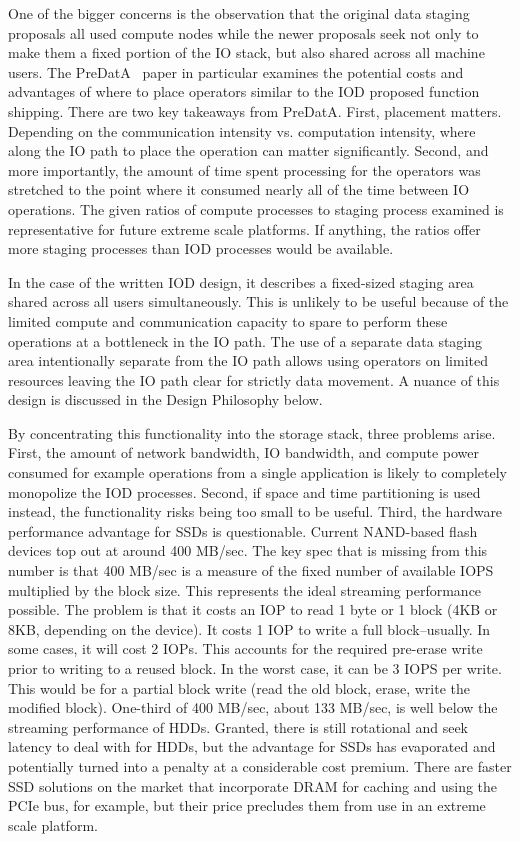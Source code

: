 \documentclass[conference]{IEEEtran}
\begin{document}
One of the bigger concerns is the observation that the original data staging
proposals all used compute nodes while the newer proposals seek not only to
make them a fixed portion of the IO stack, but also shared across all machine
users. The PreDatA~\cite{zheng:2010:predata} paper in particular examines the
potential costs and advantages of where to place operators similar to the IOD
proposed function shipping. There are two key takeaways from PreDatA. First,
placement matters.  Depending on the communication intensity vs. computation
intensity, where along the IO path to place the operation can matter
significantly. Second, and more importantly, the amount of time spent
processing for the operators was stretched to the point where it consumed
nearly all of the time between IO operations. The given ratios of compute
processes to staging process examined is representative for future extreme
scale platforms. If anything, the ratios offer more staging processes than IOD
processes would be available.

In the case of the written IOD design, it describes a fixed-sized staging area
shared across all users simultaneously.  This is unlikely to be useful because
of the limited compute and communication capacity to spare to perform these
operations at a bottleneck in the IO path.  The use of a separate data staging
area intentionally separate from the IO path allows using operators on limited
resources leaving the IO path clear for strictly data movement. A nuance of
this design is discussed in the Design Philosophy below.

By concentrating this functionality into the storage stack, three problems
arise.  First, the amount of network bandwidth, IO bandwidth, and compute power
consumed for example operations from a single application is likely to
completely monopolize the IOD processes. Second, if space and time partitioning
is used instead, the functionality risks being too small to be useful. Third,
the hardware performance advantage for SSDs is questionable. Current NAND-based
flash devices top out at around 400 MB/sec. The key spec that is missing from
this number is that 400 MB/sec is a measure of the fixed number of available
IOPS multiplied by the block size. This represents the ideal streaming
performance possible. The problem is that it costs an IOP to read 1 byte or 1
block (4KB or 8KB, depending on the device). It costs 1 IOP to write a full
block--usually. In some cases, it will cost 2 IOPs.  This accounts for the
required pre-erase write prior to writing to a reused block. In the worst case,
it can be 3 IOPS per write. This would be for a partial block write (read the
old block, erase, write the modified block). One-third of 400 MB/sec, about 133
MB/sec, is well below the streaming performance of HDDs.  Granted, there is
still rotational and seek latency to deal with for HDDs, but the advantage for
SSDs has evaporated and potentially turned into a penalty at a considerable
cost premium.  There are faster SSD solutions on the market that incorporate
DRAM for caching and using the PCIe bus, for example, but their price precludes
them from use in an extreme scale platform.
\end{document}
